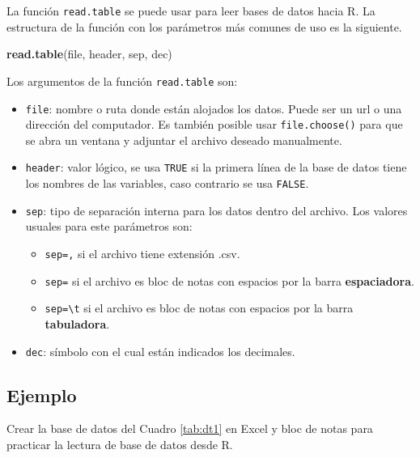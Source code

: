 \documentclass[10pt,]{krantz}
\makeatletter
\newenvironment{Shaded}{\begin{snugshade}}{\end{snugshade}}
\newcommand{\KeywordTok}[1]{\textcolor[rgb]{0.13,0.29,0.53}{\textbf{#1}}}
\newcommand{\NormalTok}[1]{#1}
\providecommand{\tightlist}{%
  \setlength{\itemsep}{0pt}\setlength{\parskip}{0pt}}
\let\proglang=\textsf
\newenvironment{kframe}{%
\medskip{}
\setlength{\fboxsep}{.8em}
 \def\at@end@of@kframe{}%
 \ifinner\ifhmode%
  \def\at@end@of@kframe{\end{minipage}}%
  \begin{minipage}{\columnwidth}%
 \fi\fi%
 \def\FrameCommand##1{\hskip\@totalleftmargin \hskip-\fboxsep
 \colorbox{shadecolor}{##1}\hskip-\fboxsep
     \hskip-\linewidth \hskip-\@totalleftmargin \hskip\columnwidth}%
 \MakeFramed {\advance\hsize-\width
   \@totalleftmargin\z@ \linewidth\hsize
   \@setminipage}}%
 {\par\unskip\endMakeFramed%
 \at@end@of@kframe}
\renewenvironment{Shaded}{\begin{kframe}}{\end{kframe}}
\makeatother
\begin{document}
La función \texttt{read.table} se puede usar para leer bases de datos
hacia \proglang{R}. La estructura de la función con los parámetros más
comunes de uso es la siguiente.

\begin{Shaded}
\begin{Highlighting}[]
\KeywordTok{read.table}\NormalTok{(file, header, sep, dec)}
\end{Highlighting}
\end{Shaded}

Los argumentos de la función \texttt{read.table} son:

\begin{itemize}
\tightlist
\item
  \texttt{file}: nombre o ruta donde están alojados los datos. Puede ser
  un url o una dirección del computador. Es también posible usar
  \texttt{file.choose()} para que se abra un ventana y adjuntar el
  archivo deseado manualmente.
\item
  \texttt{header}: valor lógico, se usa \texttt{TRUE} si la primera
  línea de la base de datos tiene los nombres de las variables, caso
  contrario se usa \texttt{FALSE}.
\item
  \texttt{sep}: tipo de separación interna para los datos dentro del
  archivo. Los valores usuales para este parámetros son:

  \begin{itemize}
  \tightlist
  \item
    \texttt{sep=\textquotesingle{},\textquotesingle{}} si el archivo
    tiene extensión .csv.
  \item
    \texttt{sep=\textquotesingle{}\textquotesingle{}} si el archivo es
    bloc de notas con espacios por la barra \textbf{espaciadora}.
  \item
    \texttt{sep=\textquotesingle{}\textbackslash{}t\textquotesingle{}}
    si el archivo es bloc de notas con espacios por la barra
    \textbf{tabuladora}.
  \end{itemize}
\item
  \texttt{dec}: símbolo con el cual están indicados los decimales.
\end{itemize}

\subsection*{Ejemplo}\label{ejemplo-24}


Crear la base de datos del Cuadro \ref{tab:dt1} en Excel y bloc de notas
para practicar la lectura de base de datos desde \proglang{R}.
\end{document}
